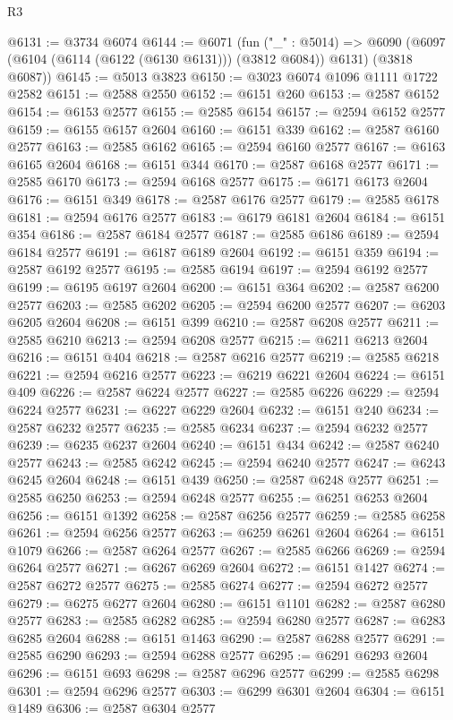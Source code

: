 \begin{lexlean}{R3}
\begin{coremodule}
@6131 := @3734 @6074
@6144 := @6071
    (fun ("_" : @5014) =>
    @6090 (@6097 (@6104 (@6114 (@6122 (@6130 @6131))) (@3812 @6084)) @6131) (@3818 @6087))
@6145 := @5013 @3823
@6150 := @3023 @6074 @1096 @1111 @1722 @2582
@6151 := @2588 @2550
@6152 := @6151 @260
@6153 := @2587 @6152
@6154 := @6153 @2577
@6155 := @2585 @6154
@6157 := @2594 @6152 @2577
@6159 := @6155 @6157 @2604
@6160 := @6151 @339
@6162 := @2587 @6160 @2577
@6163 := @2585 @6162
@6165 := @2594 @6160 @2577
@6167 := @6163 @6165 @2604
@6168 := @6151 @344
@6170 := @2587 @6168 @2577
@6171 := @2585 @6170
@6173 := @2594 @6168 @2577
@6175 := @6171 @6173 @2604
@6176 := @6151 @349
@6178 := @2587 @6176 @2577
@6179 := @2585 @6178
@6181 := @2594 @6176 @2577
@6183 := @6179 @6181 @2604
@6184 := @6151 @354
@6186 := @2587 @6184 @2577
@6187 := @2585 @6186
@6189 := @2594 @6184 @2577
@6191 := @6187 @6189 @2604
@6192 := @6151 @359
@6194 := @2587 @6192 @2577
@6195 := @2585 @6194
@6197 := @2594 @6192 @2577
@6199 := @6195 @6197 @2604
@6200 := @6151 @364
@6202 := @2587 @6200 @2577
@6203 := @2585 @6202
@6205 := @2594 @6200 @2577
@6207 := @6203 @6205 @2604
@6208 := @6151 @399
@6210 := @2587 @6208 @2577
@6211 := @2585 @6210
@6213 := @2594 @6208 @2577
@6215 := @6211 @6213 @2604
@6216 := @6151 @404
@6218 := @2587 @6216 @2577
@6219 := @2585 @6218
@6221 := @2594 @6216 @2577
@6223 := @6219 @6221 @2604
@6224 := @6151 @409
@6226 := @2587 @6224 @2577
@6227 := @2585 @6226
@6229 := @2594 @6224 @2577
@6231 := @6227 @6229 @2604
@6232 := @6151 @240
@6234 := @2587 @6232 @2577
@6235 := @2585 @6234
@6237 := @2594 @6232 @2577
@6239 := @6235 @6237 @2604
@6240 := @6151 @434
@6242 := @2587 @6240 @2577
@6243 := @2585 @6242
@6245 := @2594 @6240 @2577
@6247 := @6243 @6245 @2604
@6248 := @6151 @439
@6250 := @2587 @6248 @2577
@6251 := @2585 @6250
@6253 := @2594 @6248 @2577
@6255 := @6251 @6253 @2604
@6256 := @6151 @1392
@6258 := @2587 @6256 @2577
@6259 := @2585 @6258
@6261 := @2594 @6256 @2577
@6263 := @6259 @6261 @2604
@6264 := @6151 @1079
@6266 := @2587 @6264 @2577
@6267 := @2585 @6266
@6269 := @2594 @6264 @2577
@6271 := @6267 @6269 @2604
@6272 := @6151 @1427
@6274 := @2587 @6272 @2577
@6275 := @2585 @6274
@6277 := @2594 @6272 @2577
@6279 := @6275 @6277 @2604
@6280 := @6151 @1101
@6282 := @2587 @6280 @2577
@6283 := @2585 @6282
@6285 := @2594 @6280 @2577
@6287 := @6283 @6285 @2604
@6288 := @6151 @1463
@6290 := @2587 @6288 @2577
@6291 := @2585 @6290
@6293 := @2594 @6288 @2577
@6295 := @6291 @6293 @2604
@6296 := @6151 @693
@6298 := @2587 @6296 @2577
@6299 := @2585 @6298
@6301 := @2594 @6296 @2577
@6303 := @6299 @6301 @2604
@6304 := @6151 @1489
@6306 := @2587 @6304 @2577

\end{coremodule}
\end{lexlean}
